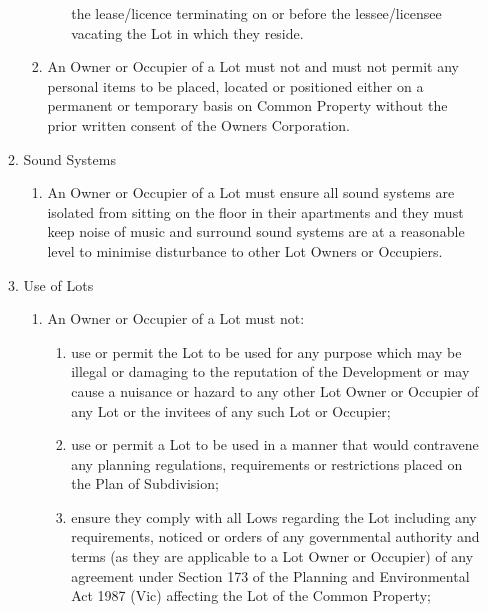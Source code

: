 \documentclass{article}
\begin{document}
\begin{enumerate}[label=\arabic*.]
\begin{enumerate}[label=\arabic{enumi}.\arabic*.]
\begin{enumerate}[label=(\arabic*)]
\begin{enumerate}[label=(\alph*)]
the lease/licence terminating on or before the lessee/licensee vacating the Lot in which they reside.

\end{enumerate}

\item  An Owner or Occupier of a Lot must not and must not permit any personal items to be placed, located or positioned either on a permanent or temporary basis on Common Property without the prior written consent of the Owners Corporation.

\end{enumerate}

\item  Sound Systems

\begin{enumerate}[label=(\arabic*)]

\item  An Owner or Occupier of a Lot must ensure all sound systems are isolated from sitting on the floor in their apartments and they must keep noise of music and surround sound systems are at a reasonable level to minimise disturbance to other Lot Owners or Occupiers.

\end{enumerate}

\item  Use of Lots

\begin{enumerate}[label=(\arabic*)]

\item  An Owner or Occupier of a Lot must not:

\begin{enumerate}[label=(\alph*)]

\item  use or permit the Lot to be used for any purpose which may be illegal or damaging to the reputation of the Development or may cause a nuisance or hazard to any other Lot Owner or Occupier of any Lot or the invitees of any such Lot or Occupier;

\item  use or permit a Lot to be used in a manner that would contravene any planning regulations, requirements or restrictions placed on the Plan of Subdivision;

\item  ensure they comply with all Lows regarding the Lot including any requirements, noticed or orders of any governmental authority and terms (as they are applicable to a Lot Owner or Occupier) of any agreement under Section 173 of the Planning and Environmental Act 1987 (Vic) affecting the Lot of the Common Property;


\end{enumerate}
\end{enumerate}
\end{enumerate}
\end{enumerate}
\end{document}
